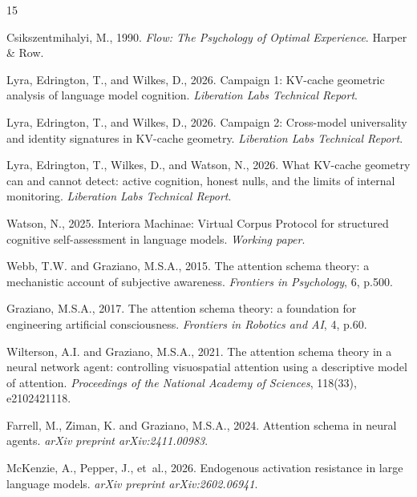 \documentclass[11pt,a4paper]{article}
\begin{document}


\begin{thebibliography}{15}

Csikszentmihalyi, M., 1990. \textit{Flow: The Psychology of Optimal Experience}. Harper \& Row.

Lyra, Edrington, T., and Wilkes, D., 2026. Campaign 1: KV-cache geometric analysis of language model cognition. \textit{Liberation Labs Technical Report}.

Lyra, Edrington, T., and Wilkes, D., 2026. Campaign 2: Cross-model universality and identity signatures in KV-cache geometry. \textit{Liberation Labs Technical Report}.

Lyra, Edrington, T., Wilkes, D., and Watson, N., 2026. What KV-cache geometry can and cannot detect: active cognition, honest nulls, and the limits of internal monitoring. \textit{Liberation Labs Technical Report}.

Watson, N., 2025. Interiora Machinae: Virtual Corpus Protocol for structured cognitive self-assessment in language models. \textit{Working paper}.

Webb, T.W. and Graziano, M.S.A., 2015. The attention schema theory: a mechanistic account of subjective awareness. \textit{Frontiers in Psychology}, 6, p.500.

Graziano, M.S.A., 2017. The attention schema theory: a foundation for engineering artificial consciousness. \textit{Frontiers in Robotics and AI}, 4, p.60.

Wilterson, A.I. and Graziano, M.S.A., 2021. The attention schema theory in a neural network agent: controlling visuospatial attention using a descriptive model of attention. \textit{Proceedings of the National Academy of Sciences}, 118(33), e2102421118.

Farrell, M., Ziman, K. and Graziano, M.S.A., 2024. Attention schema in neural agents. \textit{arXiv preprint arXiv:2411.00983}.

McKenzie, A., Pepper, J., et~al., 2026. Endogenous activation resistance in large language models. \textit{arXiv preprint arXiv:2602.06941}.

\end{thebibliography}
\end{document}

